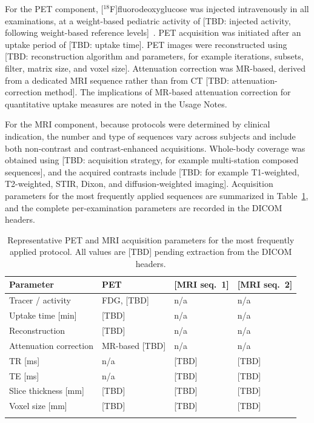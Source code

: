 For the PET component, [$^{18}$F]fluorodeoxyglucose was injected intravenously in all examinations, at a weight-based pediatric activity of [TBD: injected activity, following weight-based reference levels]~\cite{Lassmann_2007}.
PET acquisition was initiated after an uptake period of [TBD: uptake time].
PET images were reconstructed using [TBD: reconstruction algorithm and parameters, for example iterations, subsets, filter, matrix size, and voxel size].
Attenuation correction was MR-based, derived from a dedicated MRI sequence rather than from CT [TBD: attenuation-correction method].
The implications of MR-based attenuation correction for quantitative uptake measures are noted in the Usage Notes.

For the MRI component, because protocols were determined by clinical indication, the number and type of sequences vary across subjects and include both non-contrast and contrast-enhanced acquisitions.
Whole-body coverage was obtained using [TBD: acquisition strategy, for example multi-station composed sequences], and the acquired contrasts include [TBD: for example T1-weighted, T2-weighted, STIR, Dixon, and diffusion-weighted imaging].
Acquisition parameters for the most frequently applied sequences are summarized in Table~\ref{tab:acq}, and the complete per-examination parameters are recorded in the DICOM headers.

\begin{table}[h]
\caption{Representative PET and MRI acquisition parameters for the most frequently applied protocol. All values are [TBD] pending extraction from the DICOM headers.}\label{tab:acq}
\begin{tabular}{@{}llll@{}}
\toprule
Parameter & PET & [MRI seq.\ 1] & [MRI seq.\ 2] \\
\midrule
Tracer / activity        & FDG, [TBD] & n/a & n/a \\
Uptake time [min]        & [TBD] & n/a & n/a \\
Reconstruction           & [TBD] & n/a & n/a \\
Attenuation correction   & MR-based [TBD] & n/a & n/a \\
TR [ms]                  & n/a & [TBD] & [TBD] \\
TE [ms]                  & n/a & [TBD] & [TBD] \\
Slice thickness [mm]     & [TBD] & [TBD] & [TBD] \\
Voxel size [mm]          & [TBD] & [TBD] & [TBD] \\
\botrule
\end{tabular}
\end{table}

